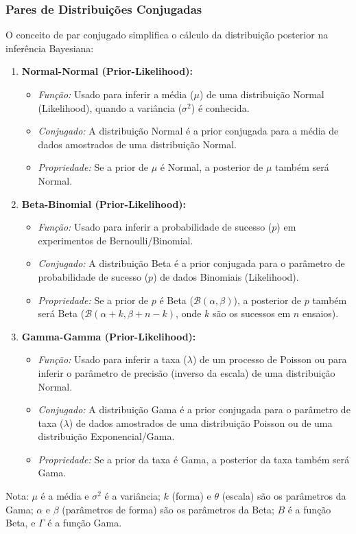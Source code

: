 \documentclass{article}
\begin{document}
\subsubsection{Pares de Distribuições Conjugadas}

O conceito de par conjugado simplifica o cálculo da distribuição posterior na inferência Bayesiana:

\begin{enumerate}
	\item \textbf{Normal-Normal (Prior-Likelihood):}
	\begin{itemize}
		\item \textit{Função:} Usado para inferir a média ($\mu$) de uma distribuição Normal (Likelihood), quando a variância ($\sigma^2$) é conhecida.
		\item \textit{Conjugado:} A distribuição Normal é a prior conjugada para a média de dados amostrados de uma distribuição Normal.
		\item \textit{Propriedade:} Se a prior de $\mu$ é Normal, a posterior de $\mu$ também será Normal.
	\end{itemize}
	
	\item \textbf{Beta-Binomial (Prior-Likelihood):}
	\begin{itemize}
		\item \textit{Função:} Usado para inferir a probabilidade de sucesso ($p$) em experimentos de Bernoulli/Binomial.
		\item \textit{Conjugado:} A distribuição Beta é a prior conjugada para o parâmetro de probabilidade de sucesso ($p$) de dados Binomiais (Likelihood).
		\item \textit{Propriedade:} Se a prior de $p$ é Beta ($\mathcal{B}(\alpha, \beta)$), a posterior de $p$ também será Beta ($\mathcal{B}(\alpha + k, \beta + n - k)$, onde $k$ são os sucessos em $n$ ensaios).
	\end{itemize}
	
	\item \textbf{Gamma-Gamma (Prior-Likelihood):}
	\begin{itemize}
		\item \textit{Função:} Usado para inferir a taxa ($\lambda$) de um processo de Poisson ou para inferir o parâmetro de precisão (inverso da escala) de uma distribuição Normal.
		\item \textit{Conjugado:} A distribuição Gama é a prior conjugada para o parâmetro de taxa ($\lambda$) de dados amostrados de uma distribuição Poisson ou de uma distribuição Exponencial/Gama.
		\item \textit{Propriedade:} Se a prior da taxa é Gama, a posterior da taxa também será Gama.
	\end{itemize}
\end{enumerate}
\footnotesize 
Nota: $\mu$ é a média e $\sigma^2$ é a variância; $k$ (forma) e $\theta$ (escala) são os parâmetros da Gama; $\alpha$ e $\beta$ (parâmetros de forma) são os parâmetros da Beta; $B$ é a função Beta, e $\Gamma$ é a função Gama.
\normalsize
\end{document}
